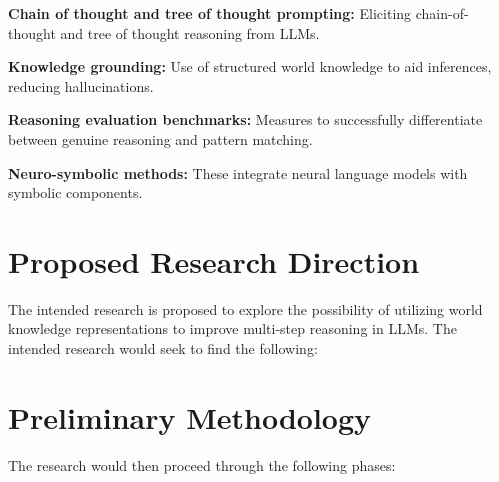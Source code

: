 \begin{bullets}
    \item \textbf{Chain of thought and tree of thought prompting:} Eliciting chain-of-thought and tree of thought reasoning from LLMs.
    \item \textbf{Knowledge grounding:} Use of structured world knowledge to aid inferences, reducing hallucinations.
    \item \textbf{Reasoning evaluation benchmarks:} Measures to successfully differentiate between genuine reasoning and pattern matching.
    \item \textbf{Neuro-symbolic methods:} These integrate neural language models with symbolic components.
\end{bullets}

\section{Proposed Research Direction}

The intended research is proposed to explore the possibility of utilizing world knowledge representations to improve multi-step reasoning in LLMs. The intended research would seek to find the following:




\section{Preliminary Methodology}

The research would then proceed through the following phases:

